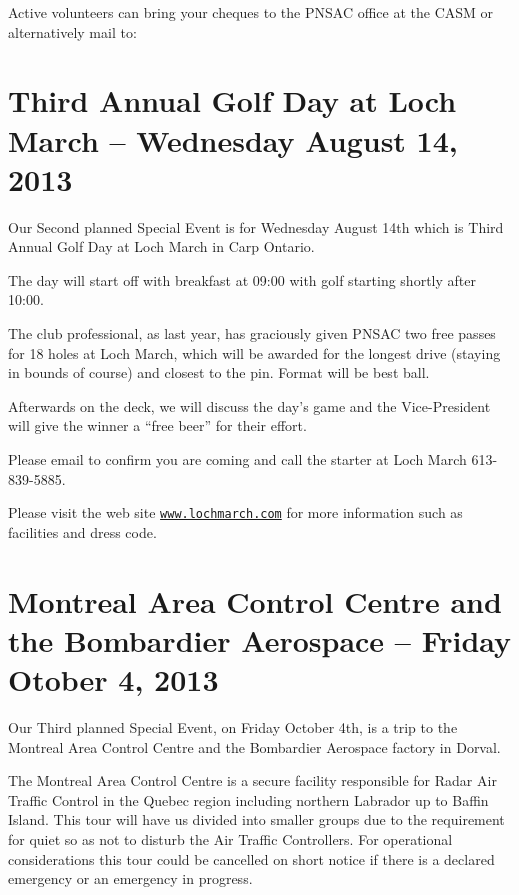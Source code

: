 Active volunteers can bring your cheques to the PNSAC office at the
CASM or alternatively mail to:

\address{PNSAC\\
P.O.Box 44005\\
514 Montreal Road\\
Ottawa, ON\\
K1K 4P8}

\section{Third Annual Golf Day at Loch March -- Wednesday August 14, 2013}
\label{sec:golf}

Our Second planned Special Event is for Wednesday August 14th which is
Third Annual Golf Day at Loch March in Carp Ontario.

The day will start off with breakfast at 09:00 with golf starting
shortly after 10:00.

The club professional, as last year, has graciously given PNSAC two
free passes for 18 holes at Loch March, which will be awarded for the
longest drive (staying in bounds of course) and closest to the
pin. Format will be best ball.

Afterwards on the deck, we will discuss the day's game and the
Vice-President will give the winner a ``free beer'' for their effort. 

Please email  to confirm you are coming
and call the starter at Loch March 613-839-5885.

Please visit the web site
{\normalfont\color{blue}\texttt{\url{www.lochmarch.com}}} for more
information such as facilities and dress code.

\section{Montreal Area Control Centre and the Bombardier Aerospace  --
Friday Otober 4, 2013}
\label{sec:montreal}

Our Third planned Special Event, on Friday October 4th, is a trip to
the Montreal Area Control Centre and the Bombardier Aerospace factory
in Dorval.

The Montreal Area Control Centre is a secure facility responsible for
Radar Air Traffic Control in the Quebec region including northern
Labrador up to Baffin Island. This tour will have us divided into
smaller groups due to the requirement for quiet so as not to disturb
the Air Traffic Controllers. For operational considerations this tour
could be cancelled on short notice if there is a declared emergency or
an emergency in progress.

